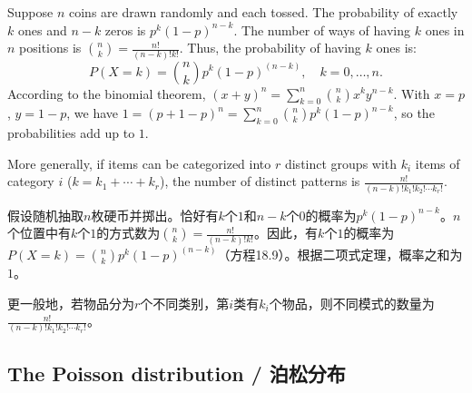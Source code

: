 \begin{original}
Suppose $n$ coins are drawn randomly and each tossed. The probability of exactly $k$ ones and $n-k$ zeros is $p^k(1-p)^{n-k}$. The number of ways of having $k$ ones in $n$ positions is $\binom{n}{k} = \frac{n!}{(n-k)!k!}$. Thus, the probability of having $k$ ones is:
\[
P(X = k) = \binom{n}{k} p^k(1-p)^{(n-k)}, \quad k = 0, \ldots, n. \tag{18.9}
\]
According to the binomial theorem, $(x + y)^n = \sum_{k=0}^{n} \binom{n}{k} x^k y^{n-k}$. With $x = p$, $y = 1-p$, we have $1 = (p + 1-p)^n = \sum_{k=0}^{n} \binom{n}{k} p^k(1-p)^{n-k}$, so the probabilities add up to $1$.

More generally, if items can be categorized into $r$ distinct groups with $k_i$ items of category $i$ ($k = k_1 + \cdots + k_r$), the number of distinct patterns is $\frac{n!}{(n-k)!k_1!k_2!\cdots k_r!}$.
\end{original}
\begin{translation}
假设随机抽取$n$枚硬币并掷出。恰好有$k$个$1$和$n-k$个$0$的概率为$p^k(1-p)^{n-k}$。$n$个位置中有$k$个$1$的方式数为$\binom{n}{k} = \frac{n!}{(n-k)!k!}$。因此，有$k$个$1$的概率为$P(X = k) = \binom{n}{k} p^k(1-p)^{(n-k)}$（方程18.9）。根据二项式定理，概率之和为$1$。

更一般地，若物品分为$r$个不同类别，第$i$类有$k_i$个物品，则不同模式的数量为$\frac{n!}{(n-k)!k_1!k_2!\cdots k_r!}$。
\end{translation}

\subsection{The Poisson distribution / 泊松分布}

